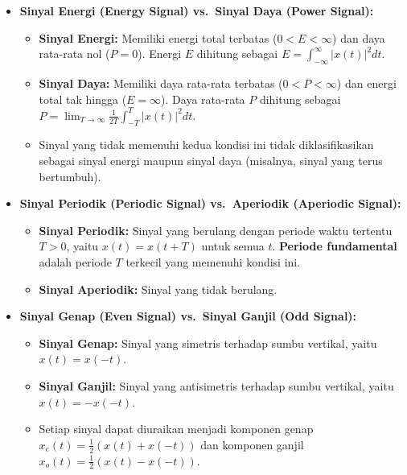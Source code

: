 \documentclass[
  letterpaper,
  DIV=11,
  numbers=noendperiod]{scrreprt}
\providecommand{\tightlist}{%
  \setlength{\itemsep}{0pt}\setlength{\parskip}{0pt}}
\begin{document}
\begin{itemize}
\item
  \textbf{Sinyal Energi (Energy Signal) vs.~Sinyal Daya (Power Signal):}

  \begin{itemize}
  \tightlist
  \item
    \textbf{Sinyal Energi:} Memiliki energi total terbatas
    (\(0 < E < \infty\)) dan daya rata-rata nol (\(P=0\)). Energi \(E\)
    dihitung sebagai \(E = \int_{-\infty}^{\infty} |x(t)|^2 dt\).
  \item
    \textbf{Sinyal Daya:} Memiliki daya rata-rata terbatas
    (\(0 < P < \infty\)) dan energi total tak hingga (\(E=\infty\)).
    Daya rata-rata \(P\) dihitung sebagai
    \(P = \lim_{T \to \infty} \frac{1}{2T} \int_{-T}^{T} |x(t)|^2 dt\).
  \item
    Sinyal yang tidak memenuhi kedua kondisi ini tidak diklasifikasikan
    sebagai sinyal energi maupun sinyal daya (misalnya, sinyal yang
    terus bertumbuh).
  \end{itemize}
\item
  \textbf{Sinyal Periodik (Periodic Signal) vs.~Aperiodik (Aperiodic
  Signal):}

  \begin{itemize}
  \tightlist
  \item
    \textbf{Sinyal Periodik:} Sinyal yang berulang dengan periode waktu
    tertentu \(T > 0\), yaitu \(x(t) = x(t+T)\) untuk semua \(t\).
    \textbf{Periode fundamental} adalah periode \(T\) terkecil yang
    memenuhi kondisi ini.
  \item
    \textbf{Sinyal Aperiodik:} Sinyal yang tidak berulang.
  \end{itemize}
\item
  \textbf{Sinyal Genap (Even Signal) vs.~Sinyal Ganjil (Odd Signal):}

  \begin{itemize}
  \tightlist
  \item
    \textbf{Sinyal Genap:} Sinyal yang simetris terhadap sumbu vertikal,
    yaitu \(x(t) = x(-t)\).
  \item
    \textbf{Sinyal Ganjil:} Sinyal yang antisimetris terhadap sumbu
    vertikal, yaitu \(x(t) = -x(-t)\).
  \item
    Setiap sinyal dapat diuraikan menjadi komponen genap
    \(x_e(t) = \frac{1}{2}(x(t) + x(-t))\) dan komponen ganjil
    \(x_o(t) = \frac{1}{2}(x(t) - x(-t))\).
  \end{itemize}
\end{itemize}
\end{document}
